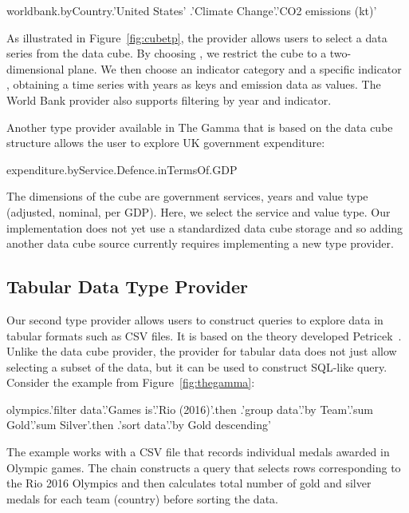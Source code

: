 \documentclass[manuscript,review,anonymous]{acmart}
\begin{document}
\begin{thegamma}
worldbank.byCountry.'United States'
  .'Climate Change'.'CO2 emissions (kt)'
\end{thegamma}

As illustrated in Figure~\ref{fig:cubetp}, the provider allows users to select a data series
from the data cube. By choosing ,
we restrict the cube to a two-dimensional plane. We then choose an indicator category
 and a specific indicator
, obtaining a time series with
years as keys and emission data as values. The World Bank provider also supports filtering
by year and indicator.

Another type provider available in The Gamma that is based on the data cube structure allows
the user to explore UK government expenditure:

\begin{thegamma}
expenditure.byService.Defence.inTermsOf.GDP
\end{thegamma}

The dimensions of the cube are government services, years and value type (adjusted, nominal,
per GDP). Here, we select the  service and  value type. Our implementation
does not yet use a standardized data cube storage and so adding another data cube source
currently requires implementing a new type provider.

\subsection{Tabular Data Type Provider}

Our second type provider allows users to construct queries to explore data in tabular formats
such as CSV files. It is based on the theory developed Petricek~\cite{dotdriven}. Unlike the  %
data cube provider, the provider for tabular data does not just allow selecting a subset of the
data, but it can be used to construct SQL-like query. Consider the example from Figure~\ref{fig:thegamma}:

\begin{thegamma}
olympics.'filter data'.'Games is'.'Rio (2016)'.then
  .'group data'.'by Team'.'sum Gold'.'sum Silver'.then
  .'sort data'.'by Gold descending'
\end{thegamma}

The example works with a CSV file that records individual medals awarded in Olympic games.
The chain constructs a query that selects rows corresponding to the Rio 2016 Olympics and then
calculates total number of gold and silver medals for each team (country) before sorting the data.
\end{document}

